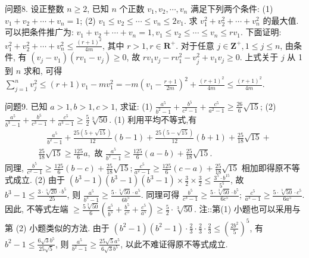 问题8. 设正整数 $n \geqslant 2$, 已知 $n$ 个正数 $v_1, v_2, \cdots, v_n$ 满足下列两个条件:
(1) $v_1+v_2+\cdots+v_n=1$;
(2) $v_1 \leqslant v_2 \leqslant \cdots \leqslant v_n \leqslant 2 v_1$.
求 $v_1^2+v_2^2+\cdots+v_n^2$ 的最大值.
可以把条件推广为: $v_1+v_2+\cdots+v_n=1, v_1 \leqslant v_2 \leqslant \cdots \leqslant v_n \leqslant r v_1$.
下面证明: $v_1^2+v_2^2+\cdots+v_n^2 \leqslant \frac{(r+1)^2}{4 m}$, 其中 $r>1, r \in \mathbf{R}^{+}$.
对于任意 $j \in \mathbf{Z}^{+}, 1 \leqslant j \leqslant n$, 由条件, 有 $\left(v_j-v_1\right)\left(r v_1-v_j\right) \geqslant 0$, 故 $r v_1 v_j-r v_1^2-v_j^2+v_1 v_j \geqslant 0$.
上式关于 $j$ 从 1 到 $n$ 求和, 可得 $\sum_{j=1}^n v_j^2 \leqslant(r+1) v_1-m v_1^2= -m\left(v_1-\frac{r+1}{2 m}\right)^2+\frac{(r+1)^2}{4 m} \leqslant \frac{(r+1)^2}{4 m}$.



问题9. 已知 $a>1, b>1, c>1$, 求证:
(1) $\frac{a^5}{b^2-1}+\frac{b^5}{c^2-1}+\frac{c^5}{a^2-1} \geqslant \frac{26}{6} \sqrt{15}$;
(2) $\frac{a^5}{b^3-1}+\frac{b^5}{c^3-1}+\frac{c^5}{a^3-1} \geqslant \frac{5}{2} \sqrt[3]{50}$.
(1) 利用平均不等式,有
$$
\begin{gathered}
\quad \frac{a^5}{b^2-1}+\frac{25(5+\sqrt{15})}{12}(b-1)+\frac{25(5-\sqrt{15})}{12}(b+1)+\frac{25}{18} \sqrt{15}+ \\
\frac{25}{18} \sqrt{15} \geqslant \frac{125}{6} a, \text { 故 } \frac{a^5}{b^2-1} \geqslant \frac{125}{6}(a-b)+\frac{25}{18} \sqrt{15} .
\end{gathered}
$$
同理, $\frac{b^5}{c^2-1} \geqslant \frac{125}{6}(b-c)+\frac{25}{18} \sqrt{15} ; \frac{c^5}{a^2-1} \geqslant \frac{125}{6}(c-a)+\frac{25}{18} \sqrt{15}$ 相加即得原不等式成立.
(2) 由于 $\left(b^3-1\right)\left(b^3-1\right)\left(b^3-1\right) \times \frac{3}{2} \times \frac{3}{2} \leqslant \frac{3^5 \cdot b^{15}}{5^5}$, 故 $b^3-1 \leqslant\frac{3 \cdot \sqrt[3]{20} \cdot b^5}{25}$, 则 $\frac{a^5}{b^3-1} \geqslant \frac{5 \cdot \sqrt[3]{50} \cdot a^5}{6 b^5}$. 同理可得 $\frac{b^5}{c^3-1} \geqslant \frac{5 \cdot \sqrt[3]{50} \cdot b^5}{6 c^5}$; $\frac{c^5}{a^3-1} \geqslant \frac{5 \cdot \sqrt[3]{50} \cdot c^5}{6 a^5}$. 因此, 不等式左端 $\geqslant \frac{5 \sqrt[3]{50}}{6}\left(\frac{a^5}{b^5}+\frac{b^5}{c^5}+\frac{c^5}{a^5}\right) \geqslant \frac{5}{2} \cdot \sqrt[3]{50}$.
注::第(1) 小题也可以采用与第 (2) 小题类似的方法.
由于 $\left(b^2-1\right)\left(b^2-1\right) \cdot \frac{2}{3} \cdot \frac{2}{3} \cdot \frac{2}{3} \leqslant\left(\frac{2 b^2}{5}\right)^5$, 有 $b^2-1 \leqslant \frac{6 \sqrt{3} b^5}{25 \sqrt{5}}$, 则 $\frac{a^5}{b^2-1} \geqslant \frac{25 \sqrt{5} a^5}{6 \sqrt{3} b^5}$, 以此不难证得原不等式成立.



